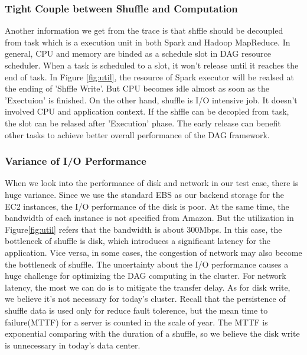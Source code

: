 \subsubsection{Tight Couple between Shuffle and Computation}
Another information we get from the trace is that shffle should be decoupled from task which is a execution unit in both Spark and Hadoop MapReduce. In general, CPU and memory are binded as a schedule slot in DAG resource scheduler. When a task is scheduled to a slot, it won't release until it reaches the end of task. In Figure \ref{fig:util}, the resource of Spark executor will be realsed at the ending of 'Shffle Write'.
But CPU becomes idle almost as soon as the 'Exectuion' is finished. On the other hand, shuffle is I/O intensive job. It doesn't involved CPU and application context. If the shffle can be decopled from task, the slot can be relased after 'Execution' phase. The early release can benefit other tasks to achieve better overall performance of the DAG framework.

\subsubsection{Variance of I/O Performance}
When we look into the performance of disk and network in our test case, there is huge variance. Since we use the standard EBS as our backend storage for the EC2 instances, the I/O performance of the disk is poor. 
At the same time, the bandwidth of each instance is not specified from Amazon. But the utilization in Figure\ref{fig:util} refers that the bandwidth is about 300Mbps. In this case, the bottleneck of shuffle is disk, which introduces a significant latency for the application. Vice versa, in some cases, the congestion of network may also become the bottleneck of shuffle\cite{varys}. The uncertainty about the I/O performance causes a huge challenge for optimizing the DAG computing in the cluster. For network latency, the most we can do is to mitigate the transfer delay. As for disk write, we believe it's not necessary for today's cluster. Recall that the persistence of shuffle data is used only for reduce fault tolerence, but the mean time to failure(MTTF) for a server is counted in the scale of year\cite{tachyon}. The MTTF is exponential comparing with the duration of a shuffle, so we believe the disk write is unnecessary in today's data center. 

